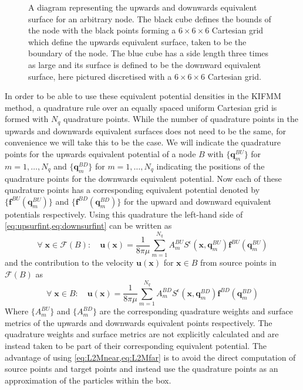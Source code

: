 \begin{figure}
    \centering
    \resizebox{.6\linewidth}{!}{}
    \caption[A diagram representing the upwards and downwards equivalent surface for an arbitrary node]{A diagram representing the upwards and downwards equivalent surface for an arbitrary node. The black cube defines the bounds of the node with the black points forming a $6 \times 6 \times 6$ Cartesian grid which define the upwards equivalent surface, taken to be the boundary of the node. The blue cube has a side length three times as large and its surface is defined to be the downward equivalent surface, here pictured discretised with a $6 \times 6 \times 6$ Cartesian grid.}
    \label{fig:UpandDownsurf}
\end{figure}

In order to be able to use these equivalent potential densities in the KIFMM method, a quadrature rule over an equally spaced uniform Cartesian grid is formed with $N_q$ quadrature points. While the number of quadrature points in the upwards and downwards equivalent surfaces does not need to be the same, for convenience we will take this to be the case. We will indicate the quadrature points for the upwards equivalent potential of a node $B$ with $\{\bm{q}^{BU}_m\}$ for $m=1,\dots,N_q$ and $\{\bm{q}^{BD}_m\}$ for $m=1,\dots,N_q$ indicating the positions of the quadrature points for the downwards equivalent potential. Now each of these quadrature points has a corresponding equivalent potential denoted by $\{\bm{f}^{BU}(\bm{q}^{BU}_m)\}$ and $\{\bm{f}^{BD}(\bm{q}^{BD}_m)\}$ for the upward and downward equivalent potentials respectively. Using this quadrature the left-hand side of \cref{eq:upsurfint,eq:downsurfint} can be written as 
\begin{equation}
\label{eq:L2Mfar}
    \forall \;\bm{x} \in \mathcal{F}(B): \quad \bm{u}(\bm{x})= \frac{1}{8 \pi \mu} \sum_{m=1}^{N_{q}} A_{m}^{BU} S^\epsilon\left(\bm{x}, \bm{q}_{m}^{B U}\right) \bm{f}^{B U}\left(\bm{q}_{m}^{B U}\right)
\end{equation}
and the contribution to the velocity $\bm{u}(\bm{x})$ for $\bm{x} \in B$ from source points in $\mathcal{F}(B)$ as
\begin{equation}
\label{eq:L2Mnear}
    \forall \;\bm{x} \in B: \quad \bm{u}(\bm{x})= \frac{1}{8 \pi \mu} \sum_{m=1}^{N_{q}} A_{m}^{BD} S^\epsilon\left(\bm{x}, \bm{q}_{m}^{B D}\right) \bm{f}^{B D}\left(\bm{q}_{m}^{B D}\right)
\end{equation}
Where $\{A_{m}^{BU}\}$ and $\{A_{m}^{BD}\}$ are the corresponding quadrature weights and surface metrics of the upwards and downwards equivalent points respectively. The quadrature weights and surface metrics are not explicitly calculated and are instead taken to be part of their corresponding equivalent potential. The advantage of using \cref{eq:L2Mnear,eq:L2Mfar} is to avoid the direct computation of source points and target points and instead use the quadrature points as an approximation of the particles within the box.

